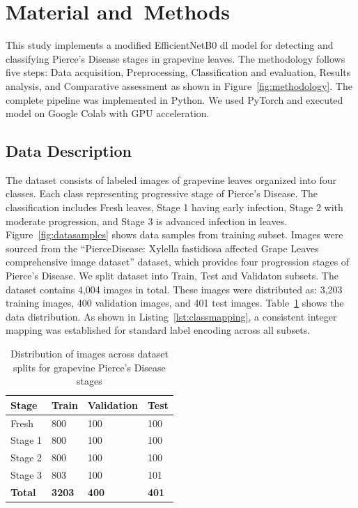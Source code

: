 \documentclass[conference]{IEEEtran}
\begin{document}
\section{Material and Methods}
\label{sec:methodology}
This study implements a modified EfficientNetB0 \ac{dl} model for detecting and classifying Pierce's Disease stages in grapevine leaves. The methodology follows five steps: Data acquisition, Preprocessing, Classification and evaluation, Results analysis, and Comparative assessment as shown in Figure~\ref{fig:methodology}. The complete pipeline was implemented in Python. We used PyTorch and executed model on Google Colab with GPU acceleration.

\subsection{Data Description}
The dataset consists of labeled images of grapevine leaves organized into four classes. Each class representing progressive stage of Pierce's Disease. The classification includes Fresh leaves, Stage 1 having early infection, Stage 2 with moderate progression, and Stage 3 is advanced infection in leaves. Figure~\ref{fig:datasamples} shows data samples from training subset. Images were sourced from the ``PierceDisease: Xylella fastidiosa affected Grape Leaves comprehensive image dataset'' \cite{Islam2025PierceDisease} dataset, which provides four progression stages of Pierce's Disease. We split dataset into Train, Test and Validaton subsets. The dataset contains 4,004 images in total. These images were distributed as: 3,203 training images, 400 validation images, and 401 test images. Table~\ref{tab:data_distribution} shows the data distribution. As shown in Listing~\ref{lst:classmapping}, a consistent integer mapping was established for standard label encoding across all subsets. 

\begin{table}[h!]
    \caption{Distribution of images across dataset splits for grapevine Pierce's Disease stages}
    \centering
    \begin{tabular}{m{} m{} m{} m{}}
        \toprule
        \textbf{Stage} & \textbf{Train} & \textbf{Validation} & \textbf{Test} \\
        \midrule
        Fresh   & 800 & 100 & 100 \\
        Stage 1 & 800 & 100 & 100 \\
        Stage 2 & 800 & 100 & 100 \\
        Stage 3 & 803 & 100 & 101 \\
        \midrule
        \textbf{Total} & \textbf{3203} & \textbf{400} & \textbf{401} \\
        \bottomrule
    \end{tabular}
    \label{tab:data_distribution}
\end{table}
\end{document}
